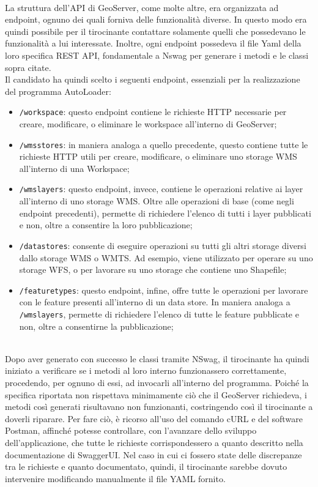\\La struttura dell'API di GeoServer, come molte altre, era organizzata ad endpoint, ognuno dei quali forniva delle funzionalità diverse. In questo modo era quindi possibile per il tirocinante contattare solamente quelli che possedevano le funzionalità a lui interessate. Inoltre, ogni endpoint possedeva il file Yaml della loro specifica REST API, fondamentale a Nswag per generare i metodi e le classi sopra citate.
\\Il candidato ha quindi scelto i seguenti endpoint, essenziali per la realizzazione del programma AutoLoader: 
\begin{itemize}
    \item \verb|/workspace|: questo endpoint contiene le richieste HTTP necessarie per creare, modificare, o eliminare le workspace all'interno di GeoServer;
    \item \verb|/wmsstores|: in maniera analoga a quello precedente, questo contiene tutte le richieste HTTP utili per creare, modificare, o eliminare uno storage WMS all'interno di una Workspace;
    \item \verb|/wmslayers|: questo endpoint, invece, contiene le operazioni relative ai layer all'interno di uno storage WMS. Oltre alle operazioni di base (come negli endpoint precedenti), permette di richiedere l'elenco di tutti i layer pubblicati e non, oltre a consentire la loro pubblicazione;
    \item \verb|/datastores|: consente di eseguire operazioni su tutti gli altri storage diversi dallo storage WMS o WMTS. Ad esempio, viene utilizzato per operare su uno storage WFS, o per lavorare su uno storage che contiene uno Shapefile;
    \item \verb|/featuretypes|: questo endpoint, infine, offre tutte le operazioni per lavorare con le feature presenti all'interno di un data store. In maniera analoga a \verb|/wmslayers|, permette di richiedere l'elenco di tutte le feature pubblicate e non, oltre a consentirne la pubblicazione;
\end{itemize}
\\Dopo aver generato con successo le classi tramite NSwag, il tirocinante ha quindi iniziato a verificare se i metodi al loro interno funzionassero correttamente, procedendo, per ognuno di essi, ad invocarli all'interno del programma. Poiché la specifica riportata non rispettava minimamente ciò che il GeoServer richiedeva, i metodi così generati risultavano non funzionanti, costringendo così il tirocinante a doverli riparare. Per fare ciò, è ricorso all'uso del comando cURL e del software Postman, affinché potesse controllare, con l'avanzare dello sviluppo dell'applicazione, che tutte le richieste corrispondessero a quanto descritto nella documentazione di SwaggerUI. Nel caso in cui ci fossero state delle discrepanze tra le richieste e quanto documentato, quindi, il tirocinante sarebbe dovuto intervenire modificando manualmente il file YAML fornito. 
